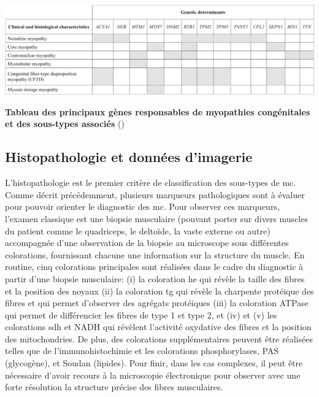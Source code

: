 \begin{table}[!ht]
\centering
\includegraphics[width=1\textwidth]{figures/gene_tab.png}
\caption[Tableau des principaux gènes responsables de myopathies congénitales et des sous-types associés]{\textbf{Tableau des principaux gènes responsables de myopathies congénitales et des sous-types associés} (\cite{cassandrini_congenital_2017})}
\label{tab:gene_myo}
\end{table}
\subsection{Histopathologie et données d'imagerie }
L'histopathologie est le premier critère de classification des sous-types de \gls{mc}. Comme décrit précédemment, plusieurs marqueurs pathologiques sont à évaluer pour pouvoir orienter le diagnostic des \gls{mc}. Pour observer ces marqueurs, l'examen classique est une biopsie musculaire (pouvant porter sur divers muscles du patient comme le quadriceps, le deltoïde, la vaste externe ou autre) accompagnée d'une observation de la biopsie au microscope sous différentes colorations, fournissant chacune une information sur la structure du muscle. En routine, cinq colorations principales sont réalisées dans le cadre du diagnostic à partir d'une biopsie musculaire: (i) la coloration \gls{he} qui révèle la taille des fibres et la position des noyaux (ii) la coloration \gls{tg} qui révèle la charpente protéique des fibres et qui permet d'observer des agrégats protéiques (iii) la coloration ATPase qui permet de différencier les fibres de type 1 et type 2, et (iv) et (v) les colorations \gls{sdh} et NADH qui révèlent l'activité oxydative des fibres et la position des mitochondries. De plus, des colorations supplémentaires peuvent être réalisées telles que de l'immunohistochimie et les colorations phosphorylases, PAS (glycogène), et Soudan (lipides). Pour finir, dans les cas complexes, il peut être nécessaire d'avoir recours à la microscopie électronique pour observer avec une forte résolution la structure précise des fibres musculaires.

